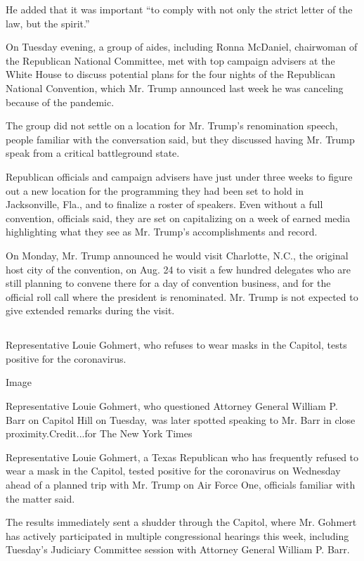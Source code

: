 He added that it was important ``to comply with not only the strict
letter of the law, but the spirit.''

On Tuesday evening, a group of aides, including Ronna McDaniel,
chairwoman of the Republican National Committee, met with top campaign
advisers at the White House to discuss potential plans for the four
nights of the Republican National Convention, which Mr. Trump announced
last week he was canceling because of the pandemic.

The group did not settle on a location for Mr. Trump's renomination
speech, people familiar with the conversation said, but they discussed
having Mr. Trump speak from a critical battleground state.

Republican officials and campaign advisers have just under three weeks
to figure out a new location for the programming they had been set to
hold in Jacksonville, Fla., and to finalize a roster of speakers. Even
without a full convention, officials said, they are set on capitalizing
on a week of earned media highlighting what they see as Mr. Trump's
accomplishments and record.

On Monday, Mr. Trump announced he would visit Charlotte, N.C., the
original host city of the convention, on Aug. 24 to visit a few hundred
delegates who are still planning to convene there for a day of
convention business, and for the official roll call where the president
is renominated. Mr. Trump is not expected to give extended remarks
during the visit.

\hypertarget{-4}{%
\subsection{}\label{-4}}

Representative Louie Gohmert, who refuses to wear masks in the Capitol,
tests positive for the coronavirus.

Image

Representative Louie Gohmert, who questioned Attorney General William P.
Barr on Capitol Hill on Tuesday,~was later spotted speaking to Mr. Barr
in close proximity.Credit...for The New York Times

Representative Louie Gohmert, a Texas Republican who has frequently
refused to wear a mask in the Capitol, tested positive for the
coronavirus on Wednesday ahead of a planned trip with Mr. Trump on Air
Force One, officials familiar with the matter said.

The results immediately sent a shudder through the Capitol, where Mr.
Gohmert has actively participated in multiple congressional hearings
this week, including Tuesday's Judiciary Committee session with Attorney
General William P. Barr.


